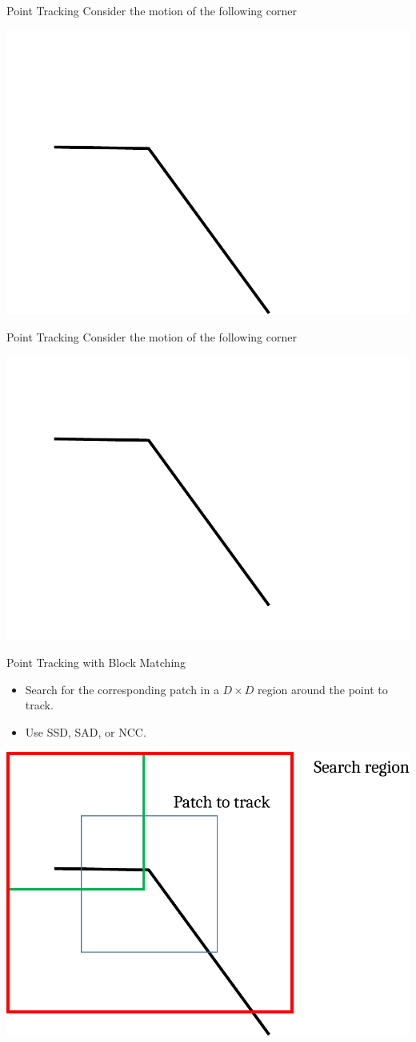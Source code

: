\begin{frame}{Point Tracking}
  Consider the motion of the following corner
  
  \begin{center}
    \includegraphics[width=0.3\columnwidth]{./images/optical_flow/point_tracking_block_matching_1.pdf}
  \end{center}
\end{frame}

\begin{frame}{Point Tracking}
  Consider the motion of the following corner
  
  \begin{center}
    \includegraphics[width=0.3\columnwidth]{./images/optical_flow/point_tracking_block_matching_2.pdf}
  \end{center}
\end{frame}

\begin{frame}{Point Tracking with Block Matching}
  \begin{itemize}
    \item Search for the corresponding patch in a $D \times D$ region around the point to track.
    \item Use SSD, SAD, or NCC.
  \end{itemize}
  
  \begin{center}
    \includegraphics[width=0.3\columnwidth]{./images/optical_flow/point_tracking_block_matching_3.pdf}
  \end{center}
\end{frame}

